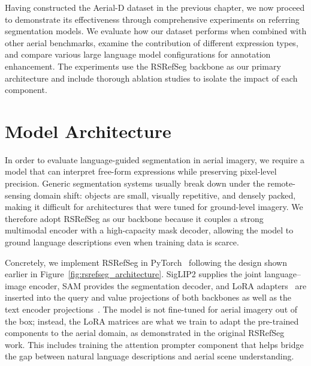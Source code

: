 \cleardoublepage
\label{chap:evaluation}

Having constructed the Aerial-D dataset in the previous chapter, we now proceed to demonstrate its effectiveness through comprehensive experiments on referring segmentation models. We evaluate how our dataset performs when combined with other aerial benchmarks, examine the contribution of different expression types, and compare various large language model configurations for annotation enhancement. The experiments use the RSRefSeg backbone as our primary architecture and include thorough ablation studies to isolate the impact of each component.

\section{Model Architecture}

In order to evaluate language-guided segmentation in aerial imagery, we require a model that can interpret free-form expressions while preserving pixel-level precision. Generic segmentation systems usually break down under the remote-sensing domain shift: objects are small, visually repetitive, and densely packed, making it difficult for architectures that were tuned for ground-level imagery. We therefore adopt RSRefSeg as our backbone because it couples a strong multimodal encoder with a high-capacity mask decoder, allowing the model to ground language descriptions even when training data is scarce.

Concretely, we implement RSRefSeg in PyTorch~\cite{pytorch} following the design shown earlier in Figure~\ref{fig:rsrefseg_architecture}. SigLIP2 supplies the joint language--image encoder, SAM provides the segmentation decoder, and LoRA adapters~\cite{lora} are inserted into the query and value projections of both backbones as well as the text encoder projections~\cite{siglip2,sam,chen2025rsrefseg}. The model is not fine-tuned for aerial imagery out of the box; instead, the LoRA matrices are what we train to adapt the pre-trained components to the aerial domain, as demonstrated in the original RSRefSeg work. This includes training the attention prompter component that helps bridge the gap between natural language descriptions and aerial scene understanding.

